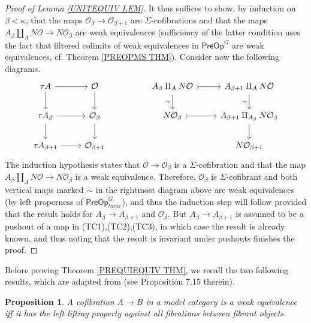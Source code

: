 \documentclass[a4paper,10pt
,draft
]{article}%
\numberwithin{equation}{section}
\numberwithin{figure}{section}
\newtheorem{proposition}[equation]{Proposition}%
\theoremstyle{definition} %
\newcommand{\1}{\ensuremath{\mathbbm 1}}%
\begin{document}
\begin{proof}[Proof of Lemma \ref{UNITEQUIV LEM}]
	It thus suffices to show, by induction on $\beta < \kappa$, 
	that the maps $\mathcal{O}_{\beta} \to \mathcal{O}_{\beta + 1}$ are $\Sigma$-cofibrations and that the maps 
	$A_{\beta} \amalg_{A} N \mathcal{O}
	\to 
	N \mathcal{O}_{\beta}$
	are weak equivalences
	(sufficiency of the latter condition uses the fact that 
	filtered colimits of weak equivalences in $\mathsf{PreOp}^G$ are weak equivalences, cf. Theorem \ref{PREOPMS THM}).
	Consider now the following diagrams.
	\[
	\begin{tikzcd}
	\tau A \ar{r} \ar{d} & \mathcal{O} \ar{d}
	&&
	A_{\beta} \amalg_{A} N \mathcal{O}
	\ar[>->]{r} \ar{d}[swap]{\sim} &
	A_{\beta+1} \amalg_{A} N \mathcal{O}
	\ar{d}[swap]{\sim}
	\\
	\tau A_{\beta} \ar{r} \ar{d} & \mathcal{O}_{\beta} \ar{d}
	&&
	N \mathcal{O}_{\beta} \ar[>->]{r} &
	A_{\beta+1} \amalg_{A_{\beta}} N \mathcal{O}_{\beta} \ar{d}
	\\
	\tau A_{\beta + 1} \ar{r} & \mathcal{O}_{\beta + 1}
	&&
	&
	N \mathcal{O}_{\beta+1}
	\end{tikzcd}
	\]
	The induction hypothesis states that
	$\mathcal{O} \to \mathcal{O}_{\beta}$ is a $\Sigma$-cofibration and that the map
	$A_{\beta} \amalg_A N \mathcal{O} \to N \mathcal{O}_{\beta}$ is a weak equivalence.
	Therefore, $\mathcal{O}_{\beta}$ is $\Sigma$-cofibrant 
	and both vertical maps marked $\sim$ in the rightmost diagram above are weak equivalences 
	(by left properness of $\mathsf{PreOp}^G_{tame}$),
	and thus the induction step will follow provided that the result holds for
	$A_{\beta} \to A_{\beta + 1}$ and $\mathcal{O}_{\beta}$.
	But $A_{\beta} \to A_{\beta + 1}$ is assumed to be a pushout of a map in (TC1),(TC2),(TC3), 
	in which case the result is already known, and thus noting that the result is invariant under pushouts finishes the proof.
\end{proof}




Before proving Theorem \ref{PREQUIEQUIV THM}, 
we recall the two following results,
which are adapted from \cite{JT07} (see Proposition 7.15 therein). 


\begin{proposition}
	A cofibration $A \to B$ in a model category
	is a weak equivalence 	
	iff it has the left lifting property against all fibrations between fibrant objects.
\end{proposition}
\end{document}
